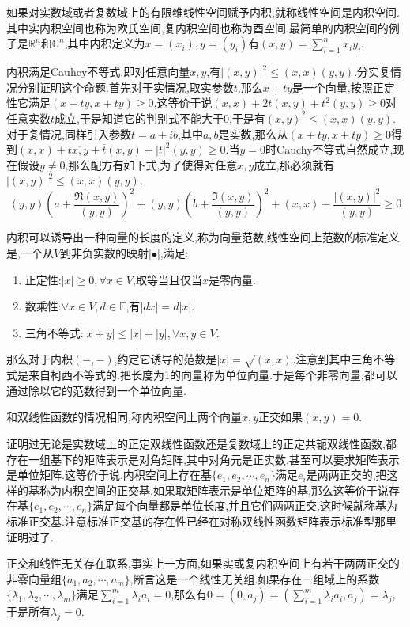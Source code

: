 如果对实数域或者复数域上的有限维线性空间赋予内积,就称线性空间是内积空间.其中实内积空间也称为欧氏空间,复内积空间也称为酉空间.最简单的内积空间的例子是$\mathbb{R}^n$和$\mathbb{C}^n$,其中内积定义为$x=(x_i),y=(y_i)$有$(x,y)=\sum_{i=1}^{n}x_iy_i$.

内积满足Cauhcy不等式.即对任意向量$x,y$,有$|(x,y)|^2\le(x,x)(y,y)$.分实复情况分别证明这个命题.首先对于实情况,取实参数$t$,那么$x+ty$是一个向量,按照正定性它满足$(x+ty,x+ty)\ge0$,这等价于说$(x,x)+2t(x,y)+t^2(y,y)\ge0$对任意实数$t$成立,于是知道它的判别式不能大于0,于是有$(x,y)^2\le(x,x)(y,y)$.对于复情况,同样引入参数$t=a+ib$,其中$a,b$是实数,那么从$(x+ty,x+ty)\ge0$得到$(x,x)+t\overline{x,y}+\overline{t}(x,y)+|t|^2(y,y)\ge0$.当$y=0$时Cauchy不等式自然成立,现在假设$y\not=0$,那么配方有如下式,为了使得对任意$x,y$成立,那必须就有$|(x,y)|^2\le(x,x)(y,y)$.
$$(y,y)\left(a+\frac{\Re(x,y)}{(y,y)}\right)^2+(y,y)\left(b+\frac{\Im(x,y)}{(y,y)}\right)^2+(x,x)-\frac{|(x,y)|^2}{(y,y)}\ge0$$

内积可以诱导出一种向量的长度的定义,称为向量范数,线性空间上范数的标准定义是,一个从$V$到非负实数的映射$|\bullet|$,满足:
\begin{enumerate}
	\item 正定性:$|x|\ge0,\forall x\in V$,取等当且仅当$x$是零向量.
	\item 数乘性:$\forall x\in V,d\in\mathbb{F}$,有$|dx|=d|x|$.
	\item 三角不等式:$|x+y|\le|x|+|y|,\forall x,y\in V$.
\end{enumerate}

那么对于内积$(-,-)$,约定它诱导的范数是$|x|=\sqrt{(x,x)}$.注意到其中三角不等式是来自柯西不等式的.把长度为1的向量称为单位向量.于是每个非零向量,都可以通过除以它的范数得到一个单位向量.

和双线性函数的情况相同,称内积空间上两个向量$x,y$正交如果$(x,y)=0$.

证明过无论是实数域上的正定双线性函数还是复数域上的正定共轭双线性函数,都存在一组基下的矩阵表示是对角矩阵,其中对角元是正实数,甚至可以要求矩阵表示是单位矩阵.这等价于说,内积空间上存在基$\{e_1,e_2,\cdots,e_n\}$满足$e_i$是两两正交的,把这样的基称为内积空间的正交基.如果取矩阵表示是单位矩阵的基,那么这等价于说存在基$\{e_1,e_2,\cdots,e_n\}$满足每个向量都是单位长度,并且它们两两正交,这时候就称基为标准正交基.注意标准正交基的存在性已经在对称双线性函数矩阵表示标准型那里证明过了.

正交和线性无关存在联系,事实上一方面,如果实或复内积空间上有若干两两正交的非零向量组$\{a_1,a_2,\cdots,a_m\}$,断言这是一个线性无关组.如果存在一组域上的系数$\{\lambda_1,\lambda_2,\cdots,\lambda_m\}$满足$\sum_{i=1}^{m}\lambda_ia_i=0$,那么有$0=(0,a_j)=(\sum_{i=1}^{m}\lambda_ia_i,a_j)=\lambda_j$,于是所有$\lambda_j=0$.

